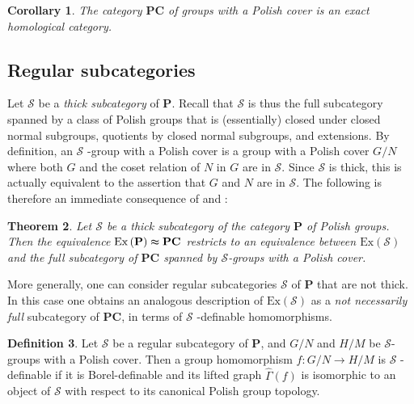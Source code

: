 \documentclass[12pt]{amsart}
\newtheorem{theorem}{Theorem}[section]
\newtheorem{corollary}[theorem]{Corollary}
\theoremstyle{definition}
\newtheorem{definition}[theorem]{Definition}
\begin{document}
\begin{corollary}
The category $\mathbf{PC}$ of groups with a Polish cover is an exact
homological category.
\end{corollary}

\subsection{Regular subcategories}

Let $\mathcal{S}$ be a \emph{thick subcategory} of $\mathbf{P}$. Recall that 
$\mathcal{S}$ is thus the full subcategory spanned by a class of Polish
groups that is (essentially) closed under closed normal subgroups, quotients
by closed normal subgroups, and extensions. By definition, an $\mathcal{S}$%
-group with a Polish cover is a group with a Polish cover $G/N$ where both $%
G $ and the coset relation of $N$ in $G$ are in $\mathcal{S}$. Since $%
\mathcal{S}$ is thick, this is actually equivalent to the assertion that $G$
and $N$ are in $\mathcal{S}$. The following is therefore an immediate
consequence of  and %
:

\begin{theorem}
\label{Theorem:main-completion-thick} Let $\mathcal{S}$ be a thick
subcategory of the category $\mathbf{P}$ of Polish groups. Then the
equivalence $\mathrm{Ex}\left( \mathbf{P}\right) \thickapprox \mathbf{PC}$
restricts to an equivalence between $\mathrm{Ex}\left( \mathcal{S}\right) $
and the full subcategory of $\mathbf{PC}$ spanned by $\mathcal{S}$-groups
with a Polish cover.
\end{theorem}

More generally, one can consider regular subcategories $\mathcal{S}$ of $%
\mathbf{P}$ that are not thick. In this case one obtains an analogous
description of $\mathrm{Ex}\left( \mathcal{S}\right) $ as a \emph{not
necessarily full} subcategory of $\mathbf{PC}$, in terms of $\mathcal{S}$%
-definable homomorphisms.

\begin{definition}
\label{Definition:S-definable} Let $\mathcal{S}$ be a regular subcategory of 
$\mathbf{P}$, and $G/N$ and $H/M$ be $\mathcal{S}$-groups with a Polish
cover. Then a group homomorphism $f:G/N\rightarrow H/M$ is $\mathcal{S}$%
-definable if it is Borel-definable and its lifted graph $\widehat{\Gamma }%
\left( f\right) $ is isomorphic to an object of $\mathcal{S}$ with respect
to its canonical Polish group topology.
\end{definition}
\end{document}
